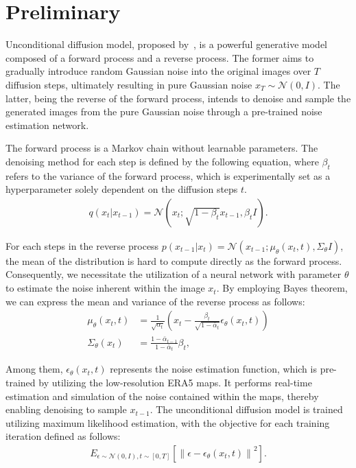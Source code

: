 \section{Preliminary}
\label{app:preliminary}
Unconditional diffusion model, proposed by~\cite{ho2020denoising}, is a powerful generative model composed of a forward process and a reverse process. 
The former aims to gradually introduce random Gaussian noise into the original images over $T$ diffusion steps, ultimately resulting in pure Gaussian noise $x_T\sim \mathcal{N}(0,I)$. 
The latter, being the reverse of the forward process, intends to denoise and sample the generated images from the pure Gaussian noise through a pre-trained noise estimation network. 

The forward process is a Markov chain without learnable parameters. 
The denoising method for each step is defined by the following equation, where $\beta_t$ refers to the variance of the forward process, which is experimentally set as a hyperparameter solely dependent on the diffusion steps $t$. 
\begin{align}
q (x_t|x_{t-1})=\mathcal{N}(x_t;\sqrt{1-\beta_t}x_{t-1},\beta_tI).
\end{align}

For each steps in the reverse process $p(x_{t-1}|x_t)=\mathcal{N}(x_{t-1};\mu_\theta(x_t,t),\Sigma_\theta I)$, the mean of the distribution is hard to compute directly as the forward process. 
Consequently, we necessitate the utilization of a neural network with parameter $\theta$ to estimate the noise inherent within the image $x_t$. 
By employing Bayes theorem, we can express the mean and variance of the reverse process as follows:
\begin{align}
\mu_\theta(x_t,t)&=\frac{1}{\sqrt{\alpha_t}}(x_t-\frac{\beta_t}{\sqrt{1-\bar{\alpha}_t}}\epsilon_\theta(x_t,t))\\
\Sigma_\theta(x_t)&=\frac{1-\bar{\alpha}_{t-1} }{1-\bar{\alpha}_{t}}\beta_t,
\end{align}

Among them, $\epsilon_\theta(x_t,t)$ represents the noise estimation function, which is pre-trained by utilizing the low-resolution ERA5 maps. 
It performs real-time estimation and simulation of the noise contained within the maps, thereby enabling denoising to sample $x_{t-1}$. 
The unconditional diffusion model is trained utilizing maximum likelihood estimation, with the objective for each training iteration defined as follows: 
\begin{align}
E_{\epsilon \sim \mathcal{N}(0,I),t\sim [0,T]}[\left \|\epsilon - \epsilon_\theta(x_t,t) \right \|^2 ].
\end{align}